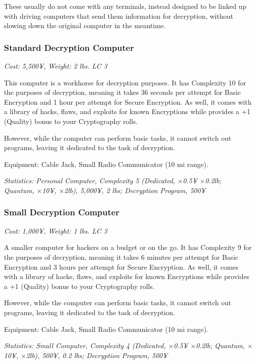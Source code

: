 \begin{multicols}{3}
	These usually do not come with any terminals, instead designed to be linked up with driving computers that send them information for decryption, without slowing down the original computer in the meantime.
	
	\subsubsection*{Standard Decryption Computer}
	
	\textit{\textcolor{NavyBlue}{Cost: 5,500¥, Weight: 2 lbs. LC 3}}
	
	This computer is a workhorse for decryption purposes. It has Complexity 10 for the purposes of decryption, meaning it takes 36 seconds per attempt for Basic Encryption and 1 hour per attempt for Secure Encryption. As well, it comes with a library of hacks, flaws, and exploits for known Encryptions while provides a +1 (Quality) bonus to your Cryptography rolls.
	
	However, while the computer can perform basic tasks, it cannot switch out programs, leaving it dedicated to the task of decryption.
	
	Equipment: Cable Jack, Small Radio Communicator (10 mi range).
	
	\textit{\textcolor{OliveGreen}{Statistics: Personal Computer, Complexity 5 (Dedicated, \(\times\)0.5¥ \(\times\)0.2lb; Quantum, \(\times\)10¥, \(\times\)2lb), 5,000¥, 2 lbs; Decryption Program, 500¥}}
	
	\subsubsection*{Small Decryption Computer}
	
	\textit{\textcolor{NavyBlue}{Cost: 1,000¥, Weight: 1 lbs. LC 3}}
	
	A smaller computer for hackers on a budget or on the go. It has Complexity 9 for the purposes of decryption, meaning it takes 6 minutes per attempt for Basic Encryption and 3 hours per attempt for Secure Encryption. As well, it comes with a library of hacks, flaws, and exploits for known Encryptions while provides a +1 (Quality) bonus to your Cryptography rolls.
	
	However, while the computer can perform basic tasks, it cannot switch out programs, leaving it dedicated to the task of decryption.
	
	Equipment: Cable Jack, Small Radio Communicator (10 mi range).
	
	\textit{\textcolor{OliveGreen}{Statistics: Small Computer, Complexity 4 (Dedicated, \(\times\)0.5¥ \(\times\)0.2lb; Quantum, \(\times\)10¥, \(\times\)2lb), 500¥, 0.2 lbs; Decryption Program, 500¥}}
	

\end{multicols}
